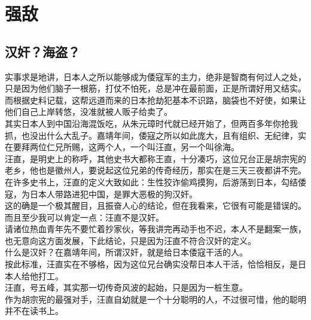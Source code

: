 \section{强敌}
\ifnum{}
	\begin{multicols}{\theparacolNo}
\fi
\subsection{汉奸？海盗？}
实事求是地讲，日本人之所以能够成为倭寇军的主力，绝非是智商有何过人之处，只是因为他们脑子一根筋，打仗不怕死，总是冲在最前面，正是所谓好用又结实。\\

而根据史料记载，这帮远道而来的日本抢劫犯基本不识路，脑袋也不好使，如果让他们自己上岸转悠，没准就被人贩子给卖了。\\

其实日本人到中国沿海混饭吃，从朱元璋时代就已经开始了，但两百多年你抢我抓，也没出什么大乱子。嘉靖年间，倭寇之所以如此庞大，且有组织、无纪律，实在要拜两位仁兄所赐，这两个人，一个叫汪直，另一个叫徐海。\\

汪直，是明史上的称呼，其他史书大都称王直，十分凑巧，这位兄台正是胡宗宪的老乡，他也是徽州人，要说起这位兄弟的传奇经历，那实在是三天三夜都讲不完。\\

在许多史书上，汪直的定义大致如此：生性狡诈偷鸡摸狗，后游荡到日本，勾结倭寇，为日本人带路进犯中国，是罪大恶极的狗汉奸。\\

这的确是一个极其醒目，且振奋人心的结论，但在我看来，它很有可能是错误的。\\

而且至少我可以肯定一点：汪直不是汉奸。\\

请诸位热血青年先不要忙着抄家伙，等我讲完再动手也不迟，本人不是翻案一族，也无意向这方面发展，下此结论，只是因为汪直不符合汉奸的定义。\\

什么是汉奸？在嘉靖年间，所谓汉奸，就是给日本倭寇干活的人。\\

按此标准，汪直实在不够格，因为这位兄台确实没帮日本人干活，恰恰相反，是日本人给他打工。\\

汪直，号五峰，其实那一切传奇风波的起始，只是因为一桩生意。\\

作为胡宗宪的最强对手，汪直自幼就是一个十分聪明的人，不过很可惜，他的聪明并不在读书上。\\


\end{multicols}
